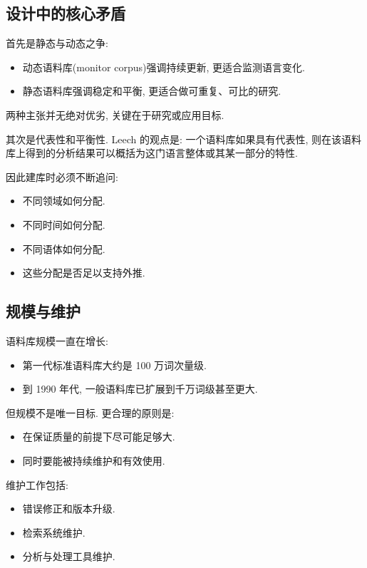 \subsection{设计中的核心矛盾}


首先是静态与动态之争:

\begin{itemize}
\item 动态语料库(monitor corpus)强调持续更新, 更适合监测语言变化.
\item 静态语料库强调稳定和平衡, 更适合做可重复、可比的研究.
\end{itemize}

两种主张并无绝对优劣, 关键在于研究或应用目标.

其次是代表性和平衡性.
Leech 的观点是: 一个语料库如果具有代表性, 则在该语料库上得到的分析结果可以概括为这门语言整体或其某一部分的特性.

因此建库时必须不断追问:

\begin{itemize}
\item 不同领域如何分配.
\item 不同时间如何分配.
\item 不同语体如何分配.
\item 这些分配是否足以支持外推.
\end{itemize}

\subsection{规模与维护}


语料库规模一直在增长:

\begin{itemize}
\item 第一代标准语料库大约是 100 万词次量级.
\item 到 1990 年代, 一般语料库已扩展到千万词级甚至更大.
\end{itemize}

但规模不是唯一目标. 更合理的原则是:

\begin{itemize}
\item 在保证质量的前提下尽可能足够大.
\item 同时要能被持续维护和有效使用.
\end{itemize}

维护工作包括:

\begin{itemize}
\item 错误修正和版本升级.
\item 检索系统维护.
\item 分析与处理工具维护.
\end{itemize}

